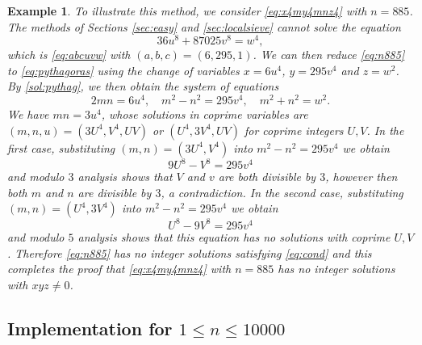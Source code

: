 \documentclass[a4paper,12pt,english,reqno]{amsart}
\newtheorem{exam}{Example}
\begin{document}
\begin{exam}
To illustrate this method, we consider \eqref{eq:x4my4mnz4} with $n=885$. The methods of Sections \ref{sec:easy} and \ref{sec:localsieve} cannot solve the equation
\begin{equation}\label{eq:n885}
    36u^8+87025v^8=w^4,
\end{equation}
which is \eqref{eq:abcuvw} with $(a,b,c)=(6,295,1)$.
We can then reduce \eqref{eq:n885} to \eqref{eq:pythagoras} using the change of variables $x=6u^4$, $y=295v^4$ and $z=w^2$. By \eqref{sol:pythag}, we then obtain the system of equations 
$$
2mn=6u^4, \quad m^2-n^2=295v^4, \quad m^2+n^2=w^2.
$$
We have $mn=3u^4$, whose solutions in coprime variables are $(m,n,u)=(3U^4,V^4,UV)$ or $(U^4,3V^4,UV)$ for coprime integers $U,V$. In the first case, substituting $(m,n)=(3U^4,V^4)$ into $m^2-n^2=295v^4$ we obtain 
$$
9U^8-V^8=295v^4
$$
and modulo $3$ analysis shows that $V$ and $v$ are both divisible by $3$, however then both $m$ and $n$ are divisible by $3$, a contradiction.
In the second case, substituting $(m,n)=(U^4,3V^4)$ into $m^2-n^2=295v^4$ we obtain 
$$
U^8-9V^8=295v^4
$$
and modulo $5$ analysis shows that this equation has no solutions with coprime $U,V$.
Therefore \eqref{eq:n885} has no integer solutions satisfying \eqref{eq:cond} and this completes the proof that \eqref{eq:x4my4mnz4} with $n=885$ has no integer solutions with $xyz \neq 0$.
\end{exam}
\subsection{Implementation for \texorpdfstring{$1\leq n \leq 10000$}{}}\label{sec:implement}
\end{document}
